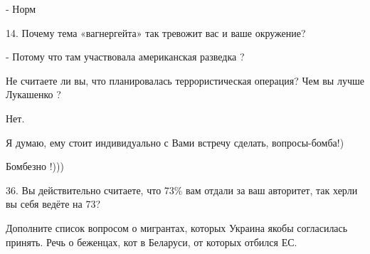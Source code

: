 \begin{itemize}
- Норм

14. Почему тема «вагнергейта» так тревожит вас и ваше окружение?

- Потому что там участвовала американская разведка ?

Не считаете ли вы, что планировалась террористическая операция? Чем вы лучше
Лукашенко ?

Нет.

Я думаю, ему стоит индивидуально с Вами встречу сделать, вопросы-бомба!)

Бомбезно !)))

36. Вы действительно считаете, что 73\% вам отдали за ваш авторитет, так херли вы себя ведёте на 73?

Дополните список вопросом о мигрантах, которых Украина якобы согласилась принять. Речь о беженцах, кот в Беларуси, от которых отбился ЕС.

\end{itemize} %
